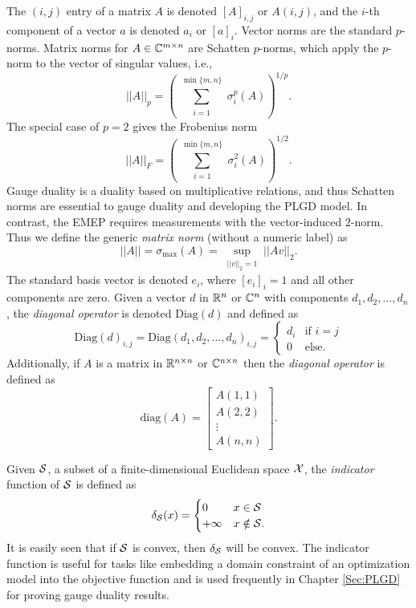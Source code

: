 The $(i,j)$ entry of a matrix $A$ is denoted $[A]_{i,j}$ or $A(i,j)$, and the $i$-th component of a vector $a$ is denoted $a_i$ or $[a]_i$.  Vector norms are the standard $p$-norms.   Matrix norms for $A \in {\mathbb C}^{m \times n}$ are Schatten $p$-norms, which apply the  $p$-norm to the vector of singular values, i.e.,
\begin{equation}  \label{Def:shatten_norms}
||A||_p  = \left( \sum_{\substack{i = 1}}^{\substack{\min\{m, n \}}} \sigma_i^p(A) \right)^{1/p}.
\end{equation}
The special case of $p = 2$ gives the Frobenius norm
\begin{equation} 	\label{Def:Frobenius_norm}
||A||_F = \left(   \sum_{\substack{i = 1}}^{\substack{\min\{m, n \}}} \sigma_i^2(A)  \right)^{1/2}.
\end{equation}
Gauge duality is a duality based on multiplicative relations, and thus Schatten norms are essential to gauge duality and developing the PLGD model.  In contrast, the EMEP requires measurements with the vector-induced $2$-norm.  Thus we define the generic \textit{matrix norm} (without a numeric label) as
\begin{equation} 		\label{Def:matrix_norm}
||A|| = \sigma_{\max}(A) = \sup_{\substack{||v||_2 = 1}} ||Av||_2.
\end{equation}
The standard basis vector is denoted $e_i$, where $[e_i]_i = 1$ and all other components are zero.  
Given a vector $d$ in ${\mathbb R}^n$ or ${\mathbb C}^n$ with components $d_1, d_2, \ldots, d_n$, the \textit{diagonal operator} is denoted $\text{Diag}(d)$ and defined as
\begin{equation}
\text{Diag}(d)_{i,j} = \text{Diag}(d_1, d_2, \ldots, d_n)_{i,j} = 
	\begin{cases}
		d_i 		&		\text{if } i = j	\\
		0		&	\text{else}.
	\end{cases}
\end{equation}
Additionally, if $A$ is a matrix in ${\mathbb R}^{n \times n}$ or ${\mathbb C}^{n \times n}$ then the \textit{diagonal operator} is defined as
\begin{equation}
\text{diag}(A) = 
	\begin{bmatrix}
		A(1,1)	\\
		A(2,2)	\\
		\vdots	\\
		A(n,n)
	\end{bmatrix}.
\end{equation}

Given ${\mathcal S}$, a subset of a finite-dimensional Euclidean space ${\mathcal X}$, the \textit{indicator} function of ${\mathcal S}$ is defined as
\begin{equation}  			\label{Def:indicator_function}
\delta_{\mathcal S}(x) =
	\begin{cases}
		0		&	x \in {\mathcal S}		\\
		+\infty		&	x \notin {\mathcal S}.
	\end{cases}
\end{equation}
It is easily seen that if ${\mathcal S}$ is convex, then $\delta_{\mathcal S}$ will be convex.  
The indicator function is useful for tasks like embedding a domain constraint of an optimization model into the objective function and is used frequently in Chapter \ref{Sec:PLGD} for proving gauge duality results.

